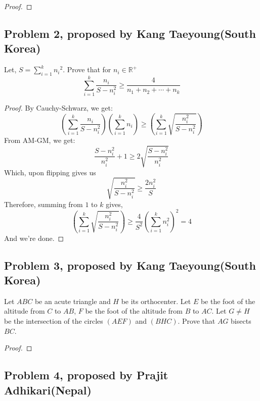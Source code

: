 \documentclass[11pt]{scrartcl}
\begin{document}
\begin{proof}
    
\end{proof}

\newpage

\subsection{Problem 2, proposed by Kang Taeyoung(South Korea)}

\begin{problem}
    Let, $\displaystyle{S =\sum_{i=1}^{k} {n_i}^2}$. Prove that for $n_i \in \mathbb{R}^+$
    $$\sum_{i=1}^{k} \frac{n_i}{S-n_i^2} \geq \frac{4}{n_1+n_2+ \cdots+ n_k}$$
\end{problem}

\begin{proof}
    By Cauchy-Schwarz, we get:
    \[
    \left( \sum_{i=1}^{k} \frac{n_i}{S-n_i^2} \right) \left( \sum_{i=1}^k n_i \right) \ge \left( \sum_{i=1}^k \sqrt{\frac{n_i^2}{S-n_i^2}} \right)
    \]
    From AM-GM, we get:
    \[
    \frac{S-n_i^2}{n_i^2} + 1 \ge 2 \sqrt{\frac{S-n_i^2}{n_i^2}}
    \]
    Which, upon flipping gives us
    \[
    \sqrt{\frac{n_i^2}{S-n_i^2}} \ge \frac{2n_i^2}{S}
    \]
    Therefore, summing from $1$ to $k$ gives,
    \[
    \left( \sum_{i=1}^k \sqrt{\frac{n_i^2}{S-n_i^2}} \right) \ge \frac{4}{S^2} \left( \sum_{i=1}^k n_i^2 \right)^2  = 4
    \]
    And we're done.
\end{proof}

\newpage

\subsection{Problem 3, proposed by Kang Taeyoung(South Korea)}

\begin{problem}
    Let $ABC$ be an acute triangle and $H$ be its orthocenter. Let $E$ be the foot of the altitude from $C$ to $AB$, 
    $F$ be the foot of the altitude from $B$ to $AC$. Let $G \neq H$ be the intersection of the circles $(AEF)$ and $(BHC)$.
    Prove that $AG$ bisects $BC$.
\end{problem}

\begin{proof}
    
\end{proof}

\newpage

\subsection{Problem 4, proposed by Prajit Adhikari(Nepal)}
\end{document}
